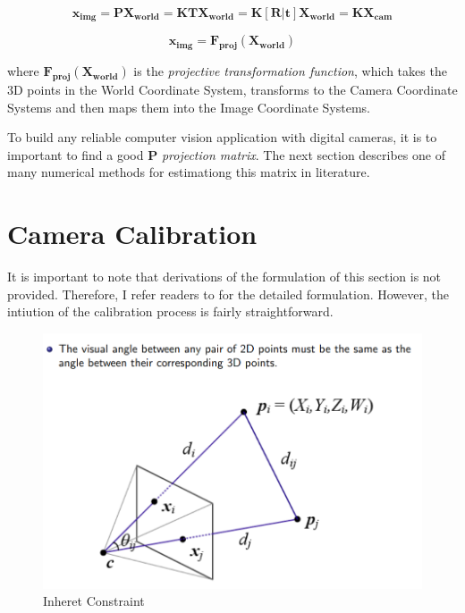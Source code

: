 \documentclass[a4paper]{report}
\numberwithin{figure}{section}
\begin{document}
\begin{equation}
  \mathbf{x_{img}} = 
  \mathbf{P}\mathbf{X_{world}} = 
  \mathbf{K}\mathbf{T}\mathbf{X_{world}} = 
  \mathbf{K}[\mathbf{R}|\mathbf{t}]\mathbf{X_{world}} =
  \mathbf{K}\mathbf{X_{cam}}
\end{equation} \label{eq:simplyfied_proj_func_1}

\begin{equation}
  \mathbf{x_{img}} = \mathbf{F_{proj}}(\mathbf{X_{world}})
\end{equation} \label{eq:simplyfied_proj_func_2}

where $\mathbf{F_{proj}}(\mathbf{X_{world}})$ is the 
\textit{projective transformation function}, which takes 
the 3D points in the World Coordinate System, transforms to 
the Camera Coordinate Systems and then maps them into the Image 
Coordinate Systems.

To build any reliable computer vision application with digital cameras, it is 
to important to find a good $\mathbf{P}$ \textit{projection matrix}. 
The next section describes one of many numerical methods for estimationg this 
matrix in literature.

\section{Camera Calibration} \label{sb_sc_calibration}


It is important to note that derivations of the formulation of this section
is not provided. Therefore, I refer readers to \cite{bla} for the detailed 
formulation. However, the intiution of the calibration process is fairly 
straightforward. 

\begin{figure}[H]
	\centering
  \includegraphics[width=\linewidth,natwidth=640,natheight=640]
  {fig/ref_imgs/calibration_dlt.png}
  \caption{Inheret Constraint}
  \label{fig:calibration_constraint}
\end{figure}
\end{document}
